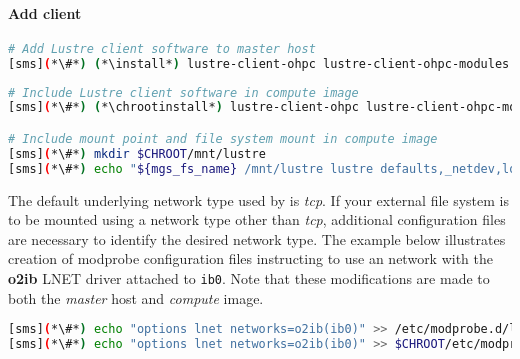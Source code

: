 \documentclass[letterpaper]{article}
\newcommand{\install}{yum -y install}
\newcommand{\chrootinstall}{yum -y --installroot=\$CHROOT install}
\begin{document}
\paragraph{Add \Lustre{} client} \label{sec:lustre_client}



\begin{lstlisting}[language=bash,keywords={},upquote=true]
# Add Lustre client software to master host
[sms](*\#*) (*\install*) lustre-client-ohpc lustre-client-ohpc-modules
\end{lstlisting}

\begin{lstlisting}[language=bash,keywords={},upquote=true]
# Include Lustre client software in compute image
[sms](*\#*) (*\chrootinstall*) lustre-client-ohpc lustre-client-ohpc-modules

# Include mount point and file system mount in compute image
[sms](*\#*) mkdir $CHROOT/mnt/lustre
[sms](*\#*) echo "${mgs_fs_name} /mnt/lustre lustre defaults,_netdev,localflock 0 0" >> $CHROOT/etc/fstab
\end{lstlisting}

The default underlying network type used by \Lustre{} is {\em tcp}. If your
external \Lustre{} file system is to be mounted using a network type other than
{\em tcp}, additional configuration files are necessary to identify the desired
network type. The example below illustrates creation of modprobe configuration files
instructing \Lustre{} to use an \InfiniBand{} network with the \textbf{o2ib} LNET driver
attached to \texttt{ib0}. Note that these modifications are made to both the
{\em master} host and {\em compute} image.

\begin{lstlisting}[language=bash,keywords={},upquote=true]
[sms](*\#*) echo "options lnet networks=o2ib(ib0)" >> /etc/modprobe.d/lustre.conf
[sms](*\#*) echo "options lnet networks=o2ib(ib0)" >> $CHROOT/etc/modprobe.d/lustre.conf
\end{lstlisting}
\end{document}
